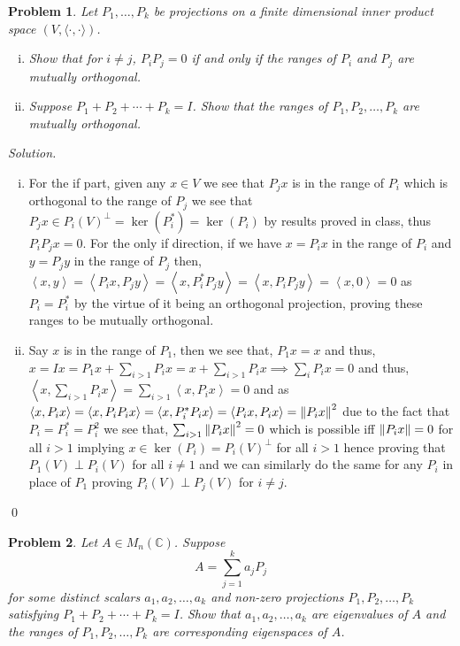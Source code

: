\documentclass[12pt,a4paper]{article}
\newenvironment{solution}{%
  \par\noindent\textit{Solution.}\ }{\qed}
\theoremstyle{problemstyle}
\newtheorem{problem}{Problem}[section]
\newcommand{\ipp}[1]{{\left\langle{#1}\right\rangle}}
\begin{document}
\begin{problem}\label{prob:4-7}
Let $P_1, \ldots, P_k$ be projections on a finite dimensional inner product space $(V, \langle \cdot, \cdot \rangle)$.
\begin{enumerate}[(i)]
    \item Show that for $i \neq j$, $P_i P_j = 0$ if and only if the ranges of $P_i$ and $P_j$ are mutually orthogonal.
    \item Suppose $P_1 + P_2 + \cdots + P_k = I$. Show that the ranges of $P_1, P_2, \ldots, P_k$ are mutually orthogonal.
\end{enumerate}
\end{problem}
\begin{solution}
	\begin{enumerate}[(i)]
		\item For the if part, given any $x\in V$ we see that $P_jx$ is in the range of $P_i$ which is orthogonal to the range of $P_j$ we see that $P_jx\in P_i(V)^\perp=\ker(P_i^*)=\ker(P_i)$ by results proved in class, thus $P_iP_jx=0$.  
		For the only if direction, if we have $x=P_ix$ in the range of $P_i$ and $y=P_jy$ in the range of $P_j$ then, $\ipp{x,y}=\ipp{P_ix,P_jy}=\ipp{x,P_i^*P_jy}=\ipp{x,P_iP_jy}=\ipp{x,0}=0$ as $P_i=P_i^*$ by the virtue of it being an orthogonal projection, proving these ranges to be mutually orthogonal. 
	\item Say $x$ is in the range of $P_1$, then we see that, $P_1x=x$ and thus, $x=Ix=P_1x+\sum_{i>1}P_ix=x+\sum_{i>1}P_ix\implies\sum_iP_ix=0$ and thus, $\ipp{x,\sum_{i>1}P_ix}=\sum_{i>1}\ipp{x,P_ix}=0$ and as $\ipp{x,P_ix}=\ipp{x,P_iP_ix}=\ipp{x,P_i^*P_ix}=\ipp{P_ix,P_ix}=\norm{P_ix}^2$ due to the fact that $P_i=P_i^*=P_i^2$ we see that, $\sum_{i>1}\norm{P_ix}^2=0$ which is possible iff $\norm{P_ix}=0$ for all $i>1$ implying $x\in\ker(P_i)=P_i(V)^\perp$ for all $i>1$ hence proving that $P_1(V)\perp P_i(V)$ for all $i\neq 1$ and we can similarly do the same for any $P_i$ in place of $P_1$ proving $P_i(V)\perp P_j(V)$ for $i\neq j$. 
	\end{enumerate}
\end{solution}
\begin{problem}\label{prob:4-8}
Let $A \in M_n(\mathbb{C})$. Suppose
\[
A = \sum_{j=1}^{k} a_j P_j
\]
for some distinct scalars $a_1, a_2, \ldots, a_k$ and non-zero projections $P_1, P_2, \ldots, P_k$ satisfying $P_1 + P_2 + \cdots + P_k = I$. Show that $a_1, a_2, \ldots, a_k$ are eigenvalues of $A$ and the ranges of $P_1, P_2, \ldots, P_k$ are corresponding eigenspaces of $A$.
\end{problem}
\end{document}
